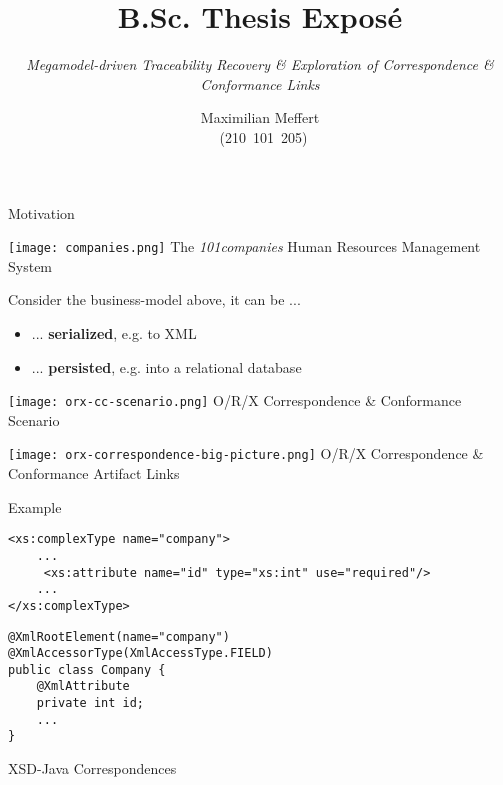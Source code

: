 \documentclass{beamer}
\title{B.Sc. Thesis Exposé}
\subtitle{\it Megamodel-driven Traceability Recovery \& Exploration of Correspondence \& Conformance Links}
\author{Maximilian Meffert\\~(210~101~205)}
\institute{University of Koblenz-Landau}
\date{}
\begin{document}
\frame{\titlepage}


\begin{frame}{Motivation}

\begin{center}
\texttt{[image: companies.png]}
\newline
\scriptsize
The \textit{101companies} Human Resources Management System
\end{center}
Consider the business-model above, it can be ...
\begin{itemize}
\item ... \textbf{serialized}, e.g. to XML
\item ... \textbf{persisted}, e.g. into a relational database
\end{itemize}

\newpage

\begin{center}
\texttt{[image: orx-cc-scenario.png]}
\newline
O/R/X Correspondence \& Conformance Scenario
\end{center}

\newpage

\begin{center}
\texttt{[image: orx-correspondence-big-picture.png]}
\newline
O/R/X Correspondence \& Conformance Artifact Links
\end{center}

\end{frame}

\begin{frame}[fragile]{Example}
\centering
\begin{lstlisting}[caption={Company.xsd}]
<xs:complexType name="company">
	...
	 <xs:attribute name="id" type="xs:int" use="required"/>
	...
</xs:complexType>
\end{lstlisting}

\begin{lstlisting}[caption={Company.java}]
@XmlRootElement(name="company")
@XmlAccessorType(XmlAccessType.FIELD)
public class Company {
	@XmlAttribute
	private int id;
	...
}
\end{lstlisting}

XSD-Java Correspondences

\end{frame}
\end{document}
